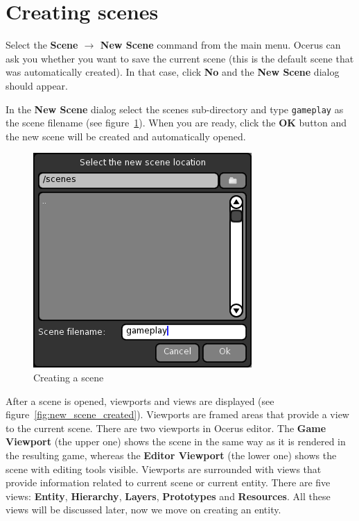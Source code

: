 \documentclass[a4paper,12pt]{article}
\begin{document}
\section{Creating scenes}
Select the \textbf{Scene $\to$ New Scene} command from the main menu. Ocerus can ask you whether you want to save the current scene (this is the default scene that was automatically created). In that case, click \textbf{No} and the \textbf{New Scene} dialog should appear.

In the \textbf{New Scene} dialog select the scenes sub-directory and type \texttt{gameplay} as the scene filename (see figure~\ref{fig:new_scene}). When you are ready, click the \textbf{OK} button and the new scene will be created and automatically opened.

\begin{figure}[ht]
 \begin{center}
  \includegraphics[scale=0.65]{NewScene}
 \end{center}
 \caption{Creating a scene}
 \label{fig:new_scene}
\end{figure}


After a scene is opened, viewports and views are displayed (see figure~\ref{fig:new_scene_created}). Viewports are framed areas that provide a view to the current scene. There are two viewports in Ocerus editor. The \textbf{Game Viewport} (the upper one) shows the scene in the same way as it is rendered in the resulting game, whereas the \textbf{Editor Viewport} (the lower one) shows the scene with editing tools visible. Viewports are surrounded with views that provide information related to current scene or current entity. There are five views: \textbf{Entity}, \textbf{Hierarchy}, 
\textbf{Layers}, \textbf{Prototypes} and \textbf{Resources}. All these views will be discussed later, now we move on creating an entity.
\end{document}
